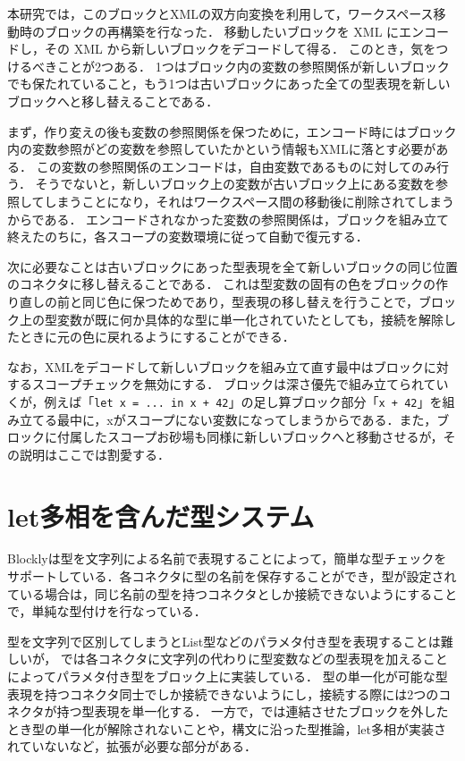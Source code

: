 本研究では，このブロックとXMLの双方向変換を利用して，ワークスペース移動時のブロックの再構築を行なった．
移動したいブロックを XML にエンコードし，その XML から新しいブロックをデコードして得る．
このとき，気をつけるべきことが2つある．
1つはブロック内の変数の参照関係が新しいブロックでも保たれていること，もう1つは古いブロックにあった全ての型表現を新しいブロックへと移し替えることである．

まず，作り変えの後も変数の参照関係を保つために，エンコード時にはブロック内の変数参照がどの変数を参照していたかという情報もXMLに落とす必要がある．
この変数の参照関係のエンコードは，自由変数であるものに対してのみ行う．
そうでないと，新しいブロック上の変数が古いブロック上にある変数を参照してしまうことになり，それはワークスペース間の移動後に削除されてしまうからである．
エンコードされなかった変数の参照関係は，ブロックを組み立て終えたのちに，各スコープの変数環境に従って自動で復元する．

次に必要なことは古いブロックにあった型表現を全て新しいブロックの同じ位置のコネクタに移し替えることである．
これは型変数の固有の色をブロックの作り直しの前と同じ色に保つためであり，型表現の移し替えを行うことで，ブロック上の型変数が既に何か具体的な型に単一化されていたとしても，接続を解除したときに元の色に戻れるようにすることができる．

なお，XMLをデコードして新しいブロックを組み立て直す最中はブロックに対するスコープチェックを無効にする．
ブロックは深さ優先で組み立てられていくが，例えば「{\tt let x = ... in x + 42}」の足し算ブロック部分「{\tt x + 42}」を組み立てる最中に，xがスコープにない変数になってしまうからである．また，ブロックに付属したスコープお砂場も同様に新しいブロックへと移動させるが，その説明はここでは割愛する．

\section {let多相を含んだ型システム\label{katasuiron}}

Blocklyは型を文字列による名前で表現することによって，簡単な型チェックをサポートしている．各コネクタに型の名前を保存することができ，型が設定されている場合は，同じ名前の型を持つコネクタとしか接続できないようにすることで，単純な型付けを行なっている．

型を文字列で区別してしまうとList型などのパラメタ付き型を表現することは難しいが，
\cite{Typed-Blockly}では各コネクタに文字列の代わりに型変数などの型表現を加えることによってパラメタ付き型をブロック上に実装している．
型の単一化が可能な型表現を持つコネクタ同士でしか接続できないようにし，接続する際には2つのコネクタが持つ型表現を単一化する．
一方で，\cite{Typed-Blockly}では連結させたブロックを外したとき型の単一化が解除されないことや，構文に沿った型推論，let多相が実装されていないなど，拡張が必要な部分がある．

